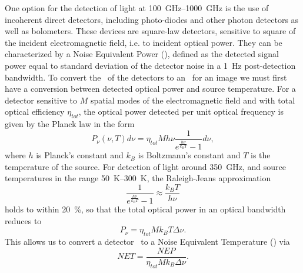 One option for the detection of light at \SIrange{100}{1000}{\GHz} is the use of incoherent direct detectors, including photo-diodes and other photon detectors as well as bolometers.
These devices are square-law detectors, sensitive to square of the incident electromagnetic field, i.e. to incident optical power.
They can be characterized by a Noise Equivalent Power (\NEP), defined as the detected signal power equal to standard deviation of the detector noise in a \SI{1}{\Hz} post-detection bandwidth.
To convert the \NEP\ of the detectors to an \NETD\ for an image we must first have a conversion between detected optical power and source temperature.
For a detector sensitive to $M$ spatial modes of the electromagnetic field and with total optical efficiency $\eta_{tot}$, the optical power detected per unit optical frequency is given by the Planck law in the form \cite{richards_bolometers_1994}
\begin{equation} \label{eqn:ch1-planck}
  P_{\nu}(\nu,T) d \nu = \eta_{tot} M h \nu \frac{1}{e^{\frac{h \nu}{k_B T}} - 1} d \nu,
\end{equation}
where $h$ is Planck's constant and $k_B$ is Boltzmann's constant and $T$ is the temperature of the source.
For detection of light around \SI{350}{\GHz}, and source temperatures in the range \SIrange{50}{300}{\K}, the Raleigh-Jeans approximation
\begin{equation}
  \frac{1}{e^{\frac{h \nu}{k_B T}} - 1} \approx \frac{k_B T}{h \nu}
\end{equation}
holds to within \SI{20}{\percent}, so that the total optical power in an optical bandwidth reduces to 
\begin{equation}
  P_{\nu} = \eta_{tot} M k_B T \Delta \nu.
\end{equation}
This allows us to convert a detector \NEP\ to a Noise Equivalent Temperature (\NET) via
\begin{equation}
  NET = \frac{NEP}{\eta_{tot} M k_B \Delta \nu}.
\end{equation}

